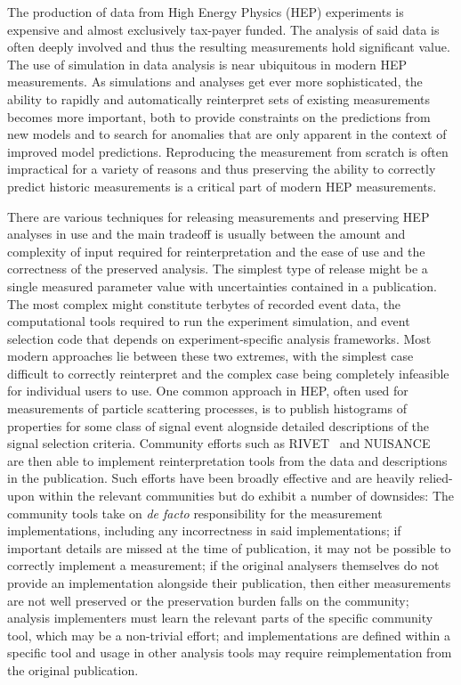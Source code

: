\documentclass{SciPost}
\begin{document}
The production of data from High Energy Physics (HEP) experiments is expensive and almost exclusively tax-payer funded. The analysis of said data is often deeply involved and thus the resulting measurements hold significant value. The use of simulation in data analysis is near ubiquitous in modern HEP measurements. As simulations and analyses get ever more sophisticated, the ability to rapidly and automatically reinterpret sets of existing measurements becomes more important, both to provide constraints on the predictions from new models and to search for anomalies that are only apparent in the context of improved model predictions. Reproducing the measurement from scratch is often impractical for a variety of reasons and thus preserving the ability to correctly predict historic measurements is a critical part of modern HEP measurements.

There are various techniques for releasing measurements and preserving HEP analyses in use and the main tradeoff is usually between the amount and complexity of input required for reinterpretation and the ease of use and the correctness of the preserved analysis. The simplest type of release might be a single measured parameter value with uncertainties contained in a publication. The most complex might constitute terbytes of recorded event data, the computational tools required to run the experiment simulation, and event selection code that depends on experiment-specific analysis frameworks. Most modern approaches lie between these two extremes, with the simplest case difficult to correctly reinterpret and the complex case being completely infeasible for individual users to use. One common approach in HEP, often used for measurements of particle scattering processes, is to publish histograms of properties for some class of signal event alognside detailed descriptions of the signal selection criteria. Community efforts such as RIVET~\cite{rivet4} and NUISANCE~\cite{nuisance_2017} are then able to implement reinterpretation tools from the data and descriptions in the publication. Such efforts have been broadly effective and are heavily relied-upon within the relevant communities but do exhibit a number of downsides: The community tools take on {\it de facto} responsibility for the measurement implementations, including any incorrectness in said implementations; if important details are missed at the time of publication, it may not be possible to correctly implement a measurement; if the original analysers themselves do not provide an implementation alongside their publication, then either measurements are not well preserved or the preservation burden falls on the community; analysis implementers must learn the relevant parts of the specific community tool, which may be a non-trivial effort; and implementations are defined within a specific tool and usage in other analysis tools may require reimplementation from the original publication. 
\end{document}
